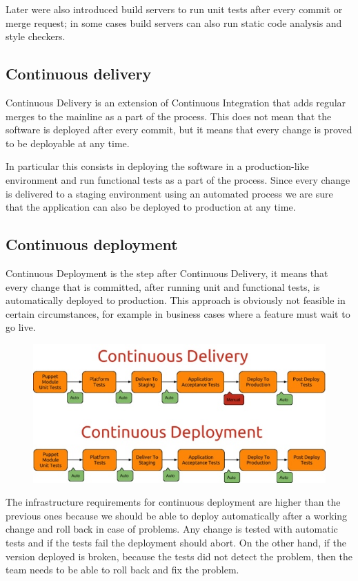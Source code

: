 Later were also introduced build servers to run unit tests after every commit
or merge request; in some cases build servers can also run static code analysis
and style checkers.

\subsection{Continuous delivery}

Continuous Delivery is an extension of Continuous Integration that adds regular
merges to the mainline as a part of the process. This does not mean that the
software is deployed after every commit, but it means that every change is
proved to be deployable at any time.

In particular this consists in deploying the software in a production-like
environment and run functional tests as a part of the process. Since every
change is delivered to a staging environment using an automated process we are
sure that the application can also be deployed to production at any time.

\subsection{Continuous deployment}

Continuous Deployment is the step after Continuous Delivery, it means that
every change that is committed, after running unit and functional tests, is
automatically deployed to production. This approach is obviously not feasible
in certain circumstances, for example in business cases where a feature must
wait to go live.

\begin{figure}[H]
\includegraphics[width=\textwidth,height=\textheight,keepaspectratio]{Introduction/Continuous_Delivery_Continuous_Deployment.jpg}
\end{figure}

The infrastructure requirements for continuous deployment are higher than
the previous ones because we should be able to deploy automatically after
a working change and roll back in case of problems. Any change is tested
with automatic tests and if the tests fail the deployment should abort. On
the other hand, if the version deployed is broken, because the tests did
not detect the problem, then the team needs to be able to roll back and
fix the problem.
